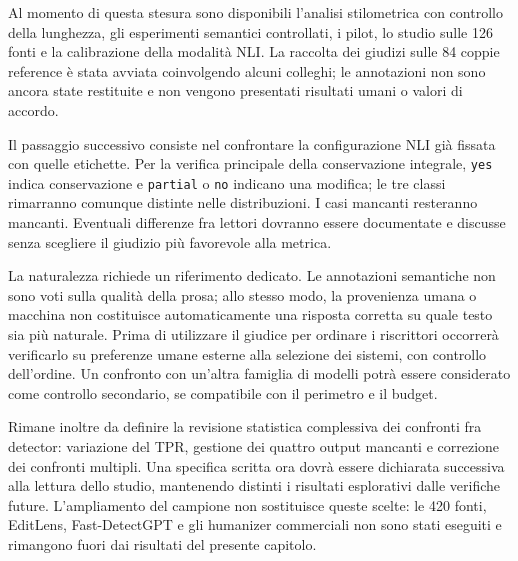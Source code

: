 Al momento di questa stesura sono disponibili l'analisi stilometrica con controllo della lunghezza, gli esperimenti semantici controllati, i pilot, lo studio sulle 126 fonti e la calibrazione della modalità NLI. La raccolta dei giudizi sulle 84 coppie reference è stata avviata coinvolgendo alcuni colleghi; le annotazioni non sono ancora state restituite e non vengono presentati risultati umani o valori di accordo.

Il passaggio successivo consiste nel confrontare la configurazione NLI già fissata con quelle etichette. Per la verifica principale della conservazione integrale, \texttt{yes} indica conservazione e \texttt{partial} o \texttt{no} indicano una modifica; le tre classi rimarranno comunque distinte nelle distribuzioni. I casi mancanti resteranno mancanti. Eventuali differenze fra lettori dovranno essere documentate e discusse senza scegliere il giudizio più favorevole alla metrica.

La naturalezza richiede un riferimento dedicato. Le annotazioni semantiche non sono voti sulla qualità della prosa; allo stesso modo, la provenienza umana o macchina non costituisce automaticamente una risposta corretta su quale testo sia più naturale. Prima di utilizzare il giudice per ordinare i riscrittori occorrerà verificarlo su preferenze umane esterne alla selezione dei sistemi, con controllo dell'ordine. Un confronto con un'altra famiglia di modelli potrà essere considerato come controllo secondario, se compatibile con il perimetro e il budget.

Rimane inoltre da definire la revisione statistica complessiva dei confronti fra detector: variazione del TPR, gestione dei quattro output mancanti e correzione dei confronti multipli. Una specifica scritta ora dovrà essere dichiarata successiva alla lettura dello studio, mantenendo distinti i risultati esplorativi dalle verifiche future. L'ampliamento del campione non sostituisce queste scelte: le 420 fonti, EditLens, Fast-DetectGPT e gli humanizer commerciali non sono stati eseguiti e rimangono fuori dai risultati del presente capitolo.
